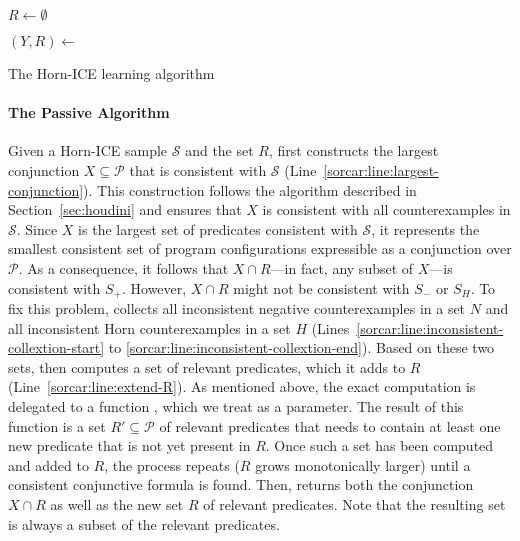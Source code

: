 \begin{algorithm}[t]
     $R \gets \emptyset$%
    \label{sorcar:line:initialize-R}
    
    \BlankLine
    
    {
        
        $(Y, R) \gets {}$\;
        \;
        
    }
    
    \caption{The \sorcar Horn-ICE learning algorithm}
    \label{alg:sorcar}
    
\end{algorithm}


\paragraph{\bf The Passive \sorcar Algorithm}
Given a Horn-ICE sample $\mathcal S$ and the set $R$, \SorcarPassive first constructs the largest conjunction $X \subseteq \mathcal P$ that is consistent with $\mathcal S$ (Line~\ref{sorcar:line:largest-conjunction}).
This construction follows the \houdini algorithm described in Section~\ref{sec:houdini} and ensures that $X$ is consistent with all counterexamples in $\mathcal S$.
Since $X$ is the largest set of predicates consistent with $\mathcal S$, it represents the smallest consistent set of program configurations expressible as a conjunction over $\mathcal P$.
As a consequence, it follows that $X \cap R$---in fact, any subset of $X$---is consistent with $S_+$.
However, $X \cap R$ might not be consistent with $S_-$ or $S_H$.
To fix this problem, \SorcarPassive collects all inconsistent negative counterexamples in a set $N$ and all inconsistent Horn counterexamples in a set $H$ (Lines~\ref{sorcar:line:inconsistent-collextion-start} to \ref{sorcar:line:inconsistent-collextion-end}).
Based on these two sets, \SorcarPassive then computes a set of relevant predicates, which it adds to $R$ (Line~\ref{sorcar:line:extend-R}).
As mentioned above, the exact computation is delegated to a function \RelevantPredicates, which we treat as a parameter. %
The result of this function is a set $R'\subseteq \mathcal P$ of relevant predicates that needs to contain at least one new predicate that is not yet present in $R$.
Once such a set has been computed and added to $R$, the process repeats ($R$ grows monotonically larger) until a consistent conjunctive formula is found.
Then, \SorcarPassive returns both the conjunction $X\cap R$ as well as the new set $R$ of relevant predicates.
Note that the resulting set is always a subset of the relevant predicates.

